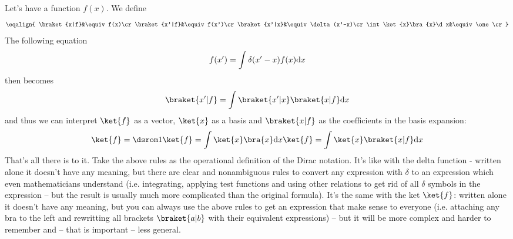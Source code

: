 Let's have a function $f(x)$. We define
$$\eqalign{
\braket{x|f}&\equiv f(x)\cr
\braket{x'|f}&\equiv f(x')\cr
\braket{x'|x}&\equiv\delta(x'-x)\cr
\int\ket{x}\bra{x}\d x&\equiv\one\cr
}$$
The following equation
$$f(x')=\int\delta(x'-x)f(x){\rm d} x$$
then becomes
$$\braket{x'|f}=\int\braket{x'|x}\braket{x|f}\d x$$
and thus we can interpret $\ket{f}$ as a vector, $\ket{x}$ as a basis and
$\braket{x|f}$ as the coefficients in the basis expansion:
$$\ket{f}=\one\ket{f}=\int\ket{x}\bra{x}\d x\ket{f}=
\int\ket{x}\braket{x|f}\d x$$
That's all there is to it. Take the above rules as the operational definition
of the Dirac notation. It's like with the delta function - written alone it
doesn't have any meaning, but there are clear and nonambiguous rules to convert
any expression with $\delta$ to an expression which even mathematicians
understand (i.e. integrating, applying test functions and using other relations
to get rid of all $\delta$ symbols in the expression -- but the result is
usually much more complicated than the original formula). It's the same with
the ket $\ket{f}$: written alone it doesn't have any meaning, but you can
always use the above rules to get an expression that make sense to everyone
(i.e. attaching any bra to the left and rewritting all brackets $\braket{a|b}$
with their equivalent expressions) -- but it will be more complex and harder to
remember and -- that is important -- less general.  

